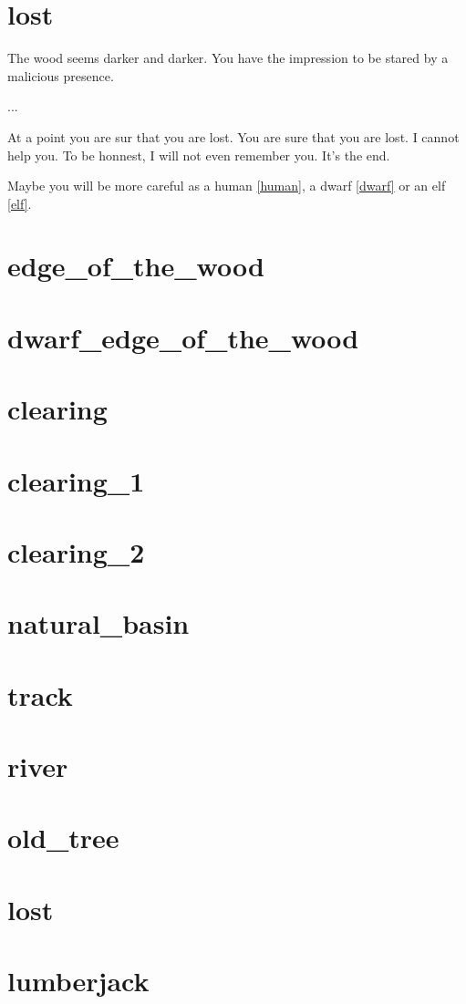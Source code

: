 \section{lost}

The wood seems darker and darker. You have the impression to be stared by a
malicious presence. 

...

At a point you are sur that you are lost. You are sure that you are lost. I
cannot help you. To be honnest, I will not even remember you. It's the end.

Maybe you will be more careful as a human \ref{human}, a dwarf \ref{dwarf} or an
elf \ref{elf}.

\section{edge_of_the_wood}
\section{dwarf_edge_of_the_wood}
\section{clearing}
\section{clearing_1}
\section{clearing_2}
\section{natural_basin}
\section{track}
\section{river}
\section{old_tree}
\section{lost}
\section{lumberjack}
